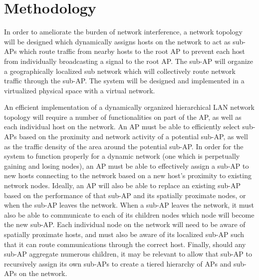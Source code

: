 \documentclass{sigcomm-alternate}
\begin{document}



\section{Methodology}
In order to ameliorate the burden of network interference, a network topology will be designed which dynamically assigns hosts on the network to act as sub-APs which route traffic from nearby hosts to the root AP to prevent each host from individually broadcasting a signal to the root AP. The sub-AP will organize a geographically localized sub network which will collectively route network traffic through the sub-AP. The system will be designed and implemented in a virtualized physical space with a virtual network.

An efficient implementation of a dynamically organized hierarchical LAN network topology will require a number of functionalities on part of the AP, as well as each individual host on the network. An AP must be able to efficiently select sub-APs based on the proximity and network activity of a potential sub-AP, as well as the traffic density of the area around the potential sub-AP. In order for the system to function properly for a dynamic network (one which is perpetually gaining and losing nodes), an AP must be able to effectively assign a sub-AP to new hosts connecting to the network based on a new host's proximity to existing network nodes. Ideally, an AP will also be able to replace an existing sub-AP based on the performance of that sub-AP and its spatially proximate nodes, or when the sub-AP leaves the network. When a sub-AP leaves the network, it must also be able to communicate to each of its children nodes which node will become the new sub-AP. Each individual node on the network will need to be aware of spatially proximate hosts, and must also be aware of its localized sub-AP such that it can route communications through the correct host. Finally, should any sub-AP aggregate numerous children, it may be relevant to allow that sub-AP to recursively assign its own sub-APs to create a tiered hierarchy of APs and sub-APs on the network.
\end{document}
